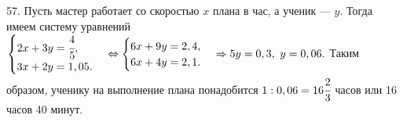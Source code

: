 57. Пусть мастер работает со скоростью $x$ плана в час, а ученик --- $y.$ Тогда имеем систему уравнений
$\begin{cases}2x+3y=\cfrac{4}{5},\\ 3x+2y=1,05.\end{cases}\Leftrightarrow
\begin{cases}6x+9y=2,4,\\ 6x+4y=2,1.\end{cases}\Rightarrow 5y=0,3,\ y=0,06.$ Таким образом, ученику на выполнение плана понадобится $1:0,06=16\cfrac{2}{3}$ часов или 16 часов 40 минут.\\
